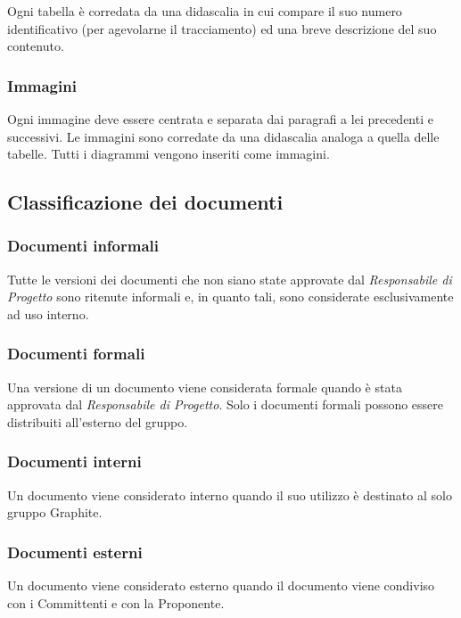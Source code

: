 \documentclass[../NormediProgetto.tex]{subfiles}
\begin{document}
Ogni tabella è corredata da una didascalia in cui compare il suo numero identificativo (per agevolarne il tracciamento) ed una breve descrizione del suo contenuto.

\subsubsection{Immagini}

Ogni immagine deve essere centrata e separata dai paragrafi a lei precedenti e successivi. Le immagini sono corredate da una didascalia analoga a quella delle tabelle. Tutti i diagrammi vengono inseriti come immagini.

\subsection{Classificazione dei documenti}

\subsubsection{Documenti informali}

Tutte le versioni dei documenti che non siano state approvate dal \textit{Responsabile di Progetto} sono ritenute informali e, in quanto tali, sono considerate esclusivamente ad uso interno.

\subsubsection{Documenti formali}

Una versione di un documento viene considerata formale quando è stata approvata dal \textit{Responsabile di Progetto}. Solo i documenti formali possono essere distribuiti all’esterno del gruppo.

\subsubsection{Documenti interni}

Un documento viene considerato interno quando il suo utilizzo è destinato al solo gruppo Graphite.

\subsubsection{Documenti esterni}

Un documento viene considerato esterno quando il documento viene condiviso con i Committenti e con la Proponente.
\end{document}
